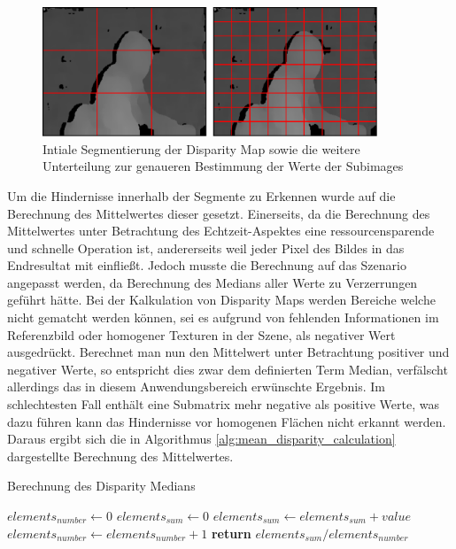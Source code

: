 \begin{figure}[h]
	\begin{center}
		\includegraphics[width=10cm]{img/subimage_segmentation.pdf}
	\end{center}
	\caption{Intiale Segmentierung der Disparity Map sowie die weitere Unterteilung zur genaueren Bestimmung der Werte der Subimages}
	\label{fig:subimage_detection_segments}
\end{figure}

\noindent
Um die Hindernisse innerhalb der Segmente zu Erkennen wurde auf die Berechnung des Mittelwertes dieser gesetzt. Einerseits, da die Berechnung des Mittelwertes unter Betrachtung des Echtzeit-Aspektes eine ressourcensparende und schnelle Operation ist, andererseits weil jeder Pixel des Bildes in das Endresultat mit einfließt. Jedoch musste die Berechnung auf das Szenario angepasst werden, da Berechnung des Medians aller Werte zu Verzerrungen geführt hätte. Bei der Kalkulation von Disparity Maps werden Bereiche welche nicht gematcht werden können, sei es aufgrund von fehlenden Informationen im Referenzbild oder homogener Texturen in der Szene, als negativer Wert ausgedrückt. Berechnet man nun den Mittelwert unter Betrachtung positiver und negativer Werte, so entspricht dies zwar dem definierten Term Median, verfälscht allerdings das in diesem Anwendungsbereich erwünschte Ergebnis. Im schlechtesten Fall enthält eine Submatrix mehr negative als positive Werte, was dazu führen kann das Hindernisse vor homogenen Flächen nicht erkannt werden. Daraus ergibt sich die in Algorithmus \ref{alg:mean_disparity_calculation} dargestellte Berechnung des Mittelwertes.

\begin{algorithm}[h]
\caption{Berechnung des Disparity Medians}
\label{alg:mean_disparity_calculation}
\begin{algorithmic}[1]
        \State $elements_{number} \gets 0$
        \State $elements_{sum} \gets 0 $
                \State $elements_{sum} \gets elements_{sum} + value$
                \State $elements_{number} \gets elements_{number} + 1$
            \EndIf
        \EndFor
        \State \textbf{return} $elements_{sum} / elements_{number}$
    \EndProcedure
\end{algorithmic}  
\end{algorithm}

